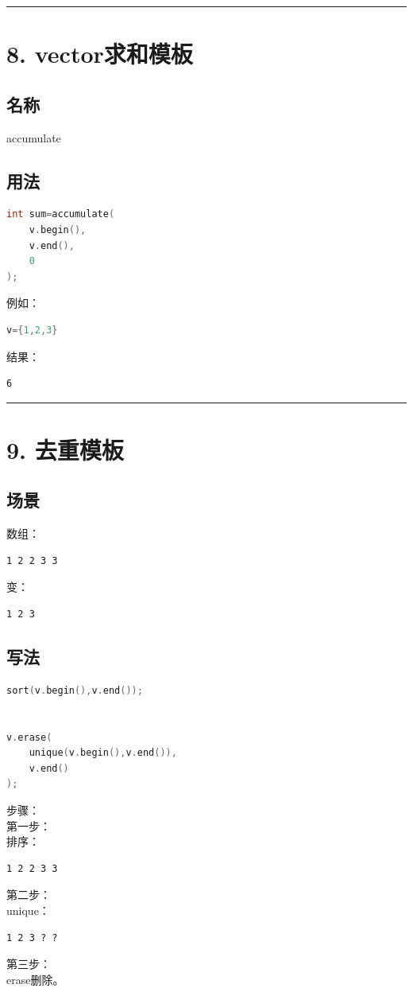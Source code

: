 \documentclass[10pt,twocolumn]{extarticle}
\begin{document}
\noindent\rule{\linewidth}{0.4pt}

\section{8. vector求和模板}

\subsection{名称}
accumulate

\subsection{用法}
\begin{lstlisting}[language=C++]
int sum=accumulate(
    v.begin(),
    v.end(),
    0
);
\end{lstlisting}
例如：
\begin{lstlisting}[language=C++]
v={1,2,3}
\end{lstlisting}
结果：
\begin{lstlisting}
6
\end{lstlisting}

\noindent\rule{\linewidth}{0.4pt}

\section{9. 去重模板}

\subsection{场景}
数组：
\begin{lstlisting}
1 2 2 3 3
\end{lstlisting}
变：
\begin{lstlisting}
1 2 3
\end{lstlisting}

\subsection{写法}
\begin{lstlisting}[language=C++]
sort(v.begin(),v.end());


v.erase(
    unique(v.begin(),v.end()),
    v.end()
);
\end{lstlisting}
步骤：\\
第一步：\\
排序：
\begin{lstlisting}
1 2 2 3 3
\end{lstlisting}
第二步：\\
unique：
\begin{lstlisting}
1 2 3 ? ?
\end{lstlisting}
第三步：\\
erase删除。
\end{document}
